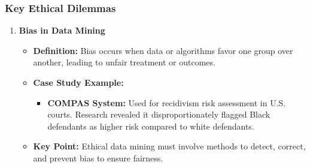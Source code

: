 \documentclass[aspectratio=169]{beamer}
\begin{document}
\begin{frame}[fragile]
    \frametitle{Key Ethical Dilemmas}
    \begin{enumerate}
        \item \textbf{Bias in Data Mining}
        \begin{itemize}
            \item \textbf{Definition:} Bias occurs when data or algorithms favor one group over another, leading to unfair treatment or outcomes.
            \item \textbf{Case Study Example:} 
            \begin{itemize}
                \item \textbf{COMPAS System:} Used for recidivism risk assessment in U.S. courts. Research revealed it disproportionately flagged Black defendants as higher risk compared to white defendants.
            \end{itemize}
            \item \textbf{Key Point:} Ethical data mining must involve methods to detect, correct, and prevent bias to ensure fairness.
        \end{itemize}
    \end{enumerate}
\end{frame}
\end{document}
